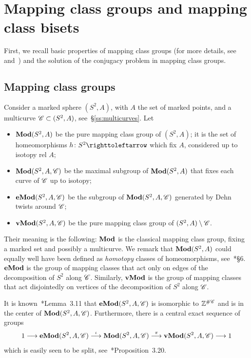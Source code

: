 \documentclass{amsart}
\begin{document}
\section{Mapping class groups and mapping class bisets}
First, we recall basic properties of mapping class groups (for more
details, see~\cite{farb-margalit:mcg} and~\cite{hemion:homeos}) and
the solution of the conjugacy problem in mapping class groups.

\subsection{Mapping class groups}
Consider a marked sphere $(S^2,A)$, with $A$ the set of marked points,
and a multicurve $\CC\subset(S^2,A)$, see~\S\ref{ss:multicurves}. Let
\begin{itemize}
\item $\Mod(S^2,A)$ be the pure mapping class group of $(S^2,A)$; it
  is the set of homeomorphisms $h\colon S^2\selfmap$ which
  fix $A$, considered up to isotopy rel $A$;
\item $\Mod(S^2,A,\CC)$ be the maximal subgroup of $\Mod(S^2,A)$
  that fixes each curve of $\CC$ up to isotopy;
\item $\Mod[e](S^2,A,\CC)$ be the subgroup of $\Mod(S^2,A,\CC)$
  generated by Dehn twists around $\CC$;
\item $\Mod[v](S^2,A,\CC)$ be the pure mapping class group of
  $(S^2,A)\setminus \CC$.
\end{itemize}
Their meaning is the following: $\Mod$ is the classical mapping class
group, fixing a marked set and possibly a multicurve.  We remark that
$\Mod(S^2,A)$ could equally well have been defined as \emph{homotopy}
classes of homeomorphisms, see~\cite{epstein:isotopies}*{\S6}.
$\Mod[e]$ is the group of mapping classes that act only on edges of
the decomposition of $S^2$ along $\CC$. Similarly, $\Mod[v]$ is the
group of mapping classes that act disjointedly on vertices of the
decomposition of $S^2$ along $\CC$.

It is known~\cite{farb-margalit:mcg}*{Lemma~3.11} that $\Mod[e](S^2,A,\CC)$
is isomorphic to $\Z^{\#\CC}$ and is in the center of
$\Mod(S^2,A,\CC)$. Furthermore, there is a central exact sequence of groups
\begin{equation}\label{eq:Mp_Gr_seq}
  1\longrightarrow\Mod[e](S^2,A,\CC)\overset \iota\longrightarrow
  \Mod(S^2,A,\CC)\overset\pi\longrightarrow\Mod[v](S^2,A,\CC)\longrightarrow1
\end{equation}
which is easily seen to be split,
see~\cite{farb-margalit:mcg}*{Proposition~3.20}.
\end{document}
